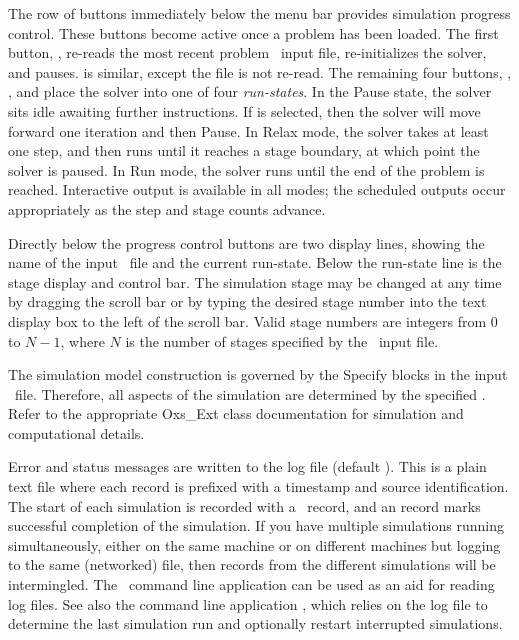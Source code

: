 The row of buttons immediately below the menu bar provides simulation
progress control.  These buttons become active once a problem has
been loaded.  The first button, , re-reads the most recent
problem \MIF\ input file, re-initializes the solver, and pauses.
 is similar, except the file is not re-read.  The remaining
four buttons, ,
,  and  place the solver into one of
four \textit{run-states}.  In the Pause state, the solver sits idle
awaiting further instructions.  If  is selected, then the
solver will move forward one iteration and then Pause.  In Relax mode,
the solver takes at least one step, and then runs until it reaches a
stage boundary, at which point the solver is paused.  In Run mode, the
solver runs until the end of the problem is reached.  Interactive output
is available in all modes; the scheduled outputs occur appropriately as
the step and stage counts advance.

Directly below the progress control buttons are two display lines,
showing the name of the input \MIF\ file and the current run-state.
Below the run-state  line is the stage display and control
bar.  The simulation stage may be changed at any time by dragging the
scroll bar or by typing the desired stage number into the text display
box to the left of the scroll bar.  Valid stage numbers are integers
from 0 to $N-1$, where $N$ is the number of stages specified by the
\MIF\ input file.

The simulation model construction is governed by the Specify blocks in
the input \MIF\ file.  Therefore, all aspects of the simulation are
determined by the specified
.
Refer to the appropriate Oxs\_Ext class documentation for simulation and
computational details.

Error and status messages are written to the log file
(default ). This is a plain text file where each
record is prefixed with a timestamp and source identification. The start
of each simulation is recorded with a \ record, and
an  record marks successful completion of the simulation. If you
have multiple simulations running simultaneously, either on the same
machine or on different machines but logging to the same (networked)
file, then records from the different simulations will be
intermingled. The \OOMMF\ command line application
 can be used as an
aid for reading  log files. See also the command line
application
, which relies on the
log file to determine the last simulation run and optionally restart
interrupted simulations.

